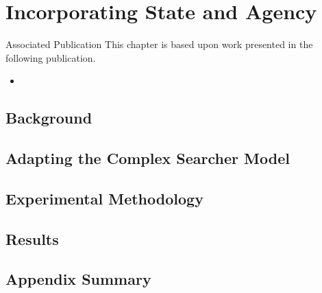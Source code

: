 
\chapter{Incorporating State and Agency}\label{appx:agency}

\begin{publications_box}{Associated Publication}
This chapter is based upon work presented in the following publication.
\vspace*{-3mm}
\begin{itemize}
    \item{}
\end{itemize}
\end{publications_box}

\section{Background}

\section{Adapting the Complex Searcher Model}

\section{Experimental Methodology}

\section{Results}

\section{Appendix Summary}